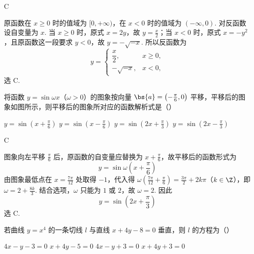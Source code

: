\begin{answer}
C
\end{answer}

\begin{solution}
原函数在 \(x\geqslant0\) 时的值域为 \([0,+\infty)\)，在 \(x<0\) 时的值域为 \(( -\infty,0)\).
对反函数设自变量为 \(x\). 当 \(x\geqslant0\) 时，原式 \(x=2y\)，故 \(y=\frac{x}{2}\)；当 \(x<0\) 时，原式 \(x=-y^2\)，且原函数这一段要求 \(y<0\)，故 \(y=-\sqrt{-x}\).
所以反函数为
\[
y=\begin{cases}
\dfrac{x}{2},&x\geqslant0,\\
-\sqrt{-x},&x<0,
\end{cases}
\]
选 C.
\end{solution}

\begin{problem}
将函数 \(y = \sin \omega x\)（\(\omega > 0\)）的图象按向量 \(\bs{a} = \left(-\frac{\pi}{6}, 0\right)\) 平移，平移后的图象如图所示，则平移后的图象所对应的函数解析式是（\quad）


\choices
    {\(y = \sin \left(x + \frac{\pi}{6}\right)\)}
    {\(y = \sin \left(x - \frac{\pi}{6}\right)\)}
    {\(y = \sin \left(2x + \frac{\pi}{3}\right)\)}
    {\(y = \sin \left(2x - \frac{\pi}{3}\right)\)}
\end{problem}

\begin{answer}
C
\end{answer}

\begin{solution}
图象向左平移 \(\frac{\pi}{6}\) 后，原函数的自变量应替换为 \(x+\frac{\pi}{6}\)，故平移后的函数形式为
\[
y=\sin\omega\left(x+\frac{\pi}{6}\right)
\]
由图象最低点在 \(x=\frac{7\pi}{12}\) 处取得 \(-1\)，代入得 \(\omega\left(\frac{7\pi}{12}+\frac{\pi}{6}\right)=\frac{3\pi}{2}+2k\pi\)（\(k\in\Z\)），即 \(\omega=2+\frac{8k}{3}\). 结合选项，\(\omega\) 只能为 \(1\) 或 \(2\)，故 \(\omega=2\). 因此
\[
y=\sin\left(2x+\frac{\pi}{3}\right)
\]
选 C.
\end{solution}

\begin{problem}
若曲线 \(y = x^4\) 的一条切线 \(l\) 与直线 \(x + 4y - 8 = 0\) 垂直，则 \(l\) 的方程为（\quad）

\choices
    {\(4x - y - 3 = 0\)}
    {\(x + 4y - 5 = 0\)}
    {\(4x - y + 3 = 0\)}
    {\(x + 4y + 3 = 0\)}
\end{problem}


